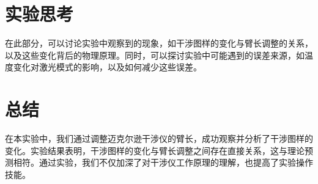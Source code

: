 \documentclass{ctexart}
\begin{document}
\section{实验思考}
在此部分，可以讨论实验中观察到的现象，如干涉图样的变化与臂长调整的关系，以及这些变化背后的物理原理。同时，可以探讨实验中可能遇到的误差来源，如温度变化对激光模式的影响，以及如何减少这些误差。

\section{总结}
在本实验中，我们通过调整迈克尔逊干涉仪的臂长，成功观察并分析了干涉图样的变化。实验结果表明，干涉图样的变化与臂长调整之间存在直接关系，这与理论预测相符。通过实验，我们不仅加深了对干涉仪工作原理的理解，也提高了实验操作技能。
\end{document}
